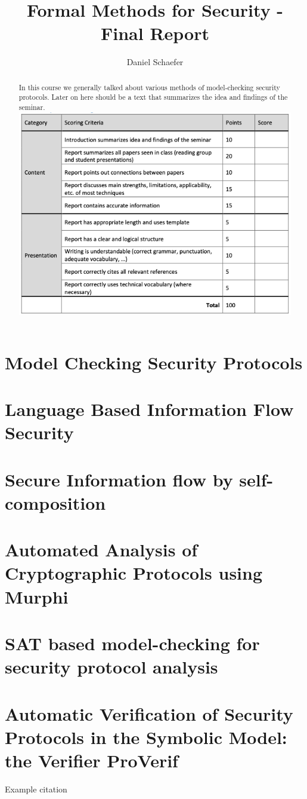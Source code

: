 \documentclass[a4paper,UKenglish]{lipics-v2018}
\title{Formal Methods for Security - Final Report}
\author{Daniel Schaefer}{2549458}{}{}{}
\begin{document}
\maketitle

\begin{abstract}
In this course we generally talked about various methods of model-checking security protocols. Later on here should be a text that summarizes the idea and findings of the seminar.\\

\includegraphics[scale = 0.72]{pictures/grading_scheme}\\
\end{abstract}


\section{Model Checking Security Protocols}


\section{Language Based Information Flow Security}



\section{Secure Information flow by self-composition}



\section{Automated Analysis of Cryptographic Protocols using Murphi}



\section{SAT based model-checking for security protocol analysis}



\section{Automatic Verification of Security Protocols in the Symbolic Model: the Verifier ProVerif}
Example citation \cite{ProVerif}




\end{document}
